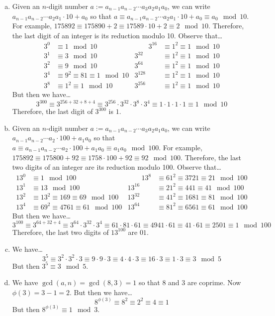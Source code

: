 \documentclass[11pt,letterpaper]{article}
\begin{document}
\sol 
\begin{enumerate}[(a)]
\item Given an $n$-digit number $a:= a_{n-1}a_{n-2} \cdots a_3a_2a_1a_0$, we can write $a_{n-1}a_{n-2} \cdots a_2a_1 \cdot 10 + a_0$ so that $a \equiv a_{n-1}a_{n-2} \cdots a_2a_1 \cdot 10 + a_0 \equiv a_0 \mod 10$. For example, $175892 \equiv 175890 + 2 \equiv 17589 \cdot 10 + 2 \equiv 2 \mod 10$. Therefore, the last digit of an integer is its reduction modulo 10. Observe that\dots
	\[
	\begin{aligned}
	3^0&\equiv 1 \mod 10 &\qquad 3^{16}&\equiv 1^2 \equiv 1 \mod 10 \\
	3^1&\equiv 3 \mod 10 & 3^{32}&\equiv 1^2 \equiv 1 \mod 10 \\
	3^2&\equiv 9 \mod 10 & 3^{64}&\equiv 1^2 \equiv 1 \mod 10 \\
	3^4&\equiv 9^2 \equiv 81 \equiv 1 \mod 10 & 3^{128}&\equiv 1^2 \equiv 1 \mod 10 \\
	3^8&\equiv 1^2 \equiv 1 \mod 10 & 3^{256}&\equiv 1^2 \equiv 1 \mod 10
	\end{aligned}
	\]
But then we have\dots
	\[
	3^{300} \equiv 3^{256 + 32 + 8 + 4} \equiv 3^{256} \cdot 3^{32} \cdot 3^8 \cdot 3^4 \equiv 1 \cdot 1 \cdot 1 \cdot 1 \equiv 1 \mod 10
	\]
Therefore, the last digit of $3^{300}$ is $1$. \pspace

\item Given an $n$-digit number $a:= a_{n-1}a_{n-2} \cdots a_3a_2a_1a_0$, we can write $a_{n-1}a_{n-2} \cdots a_2 \cdot 100 + a_1a_0$ so that $a \equiv a_{n-1}a_{n-2} \cdots a_2 \cdot 100 + a_1a_0 \equiv a_1a_0 \mod 100$. For example, $175892 \equiv 175800 + 92 \equiv 1758 \cdot 100 + 92 \equiv 92 \mod 100$. Therefore, the last two digits of an integer are its reduction modulo 100. Observe that\dots
	\[
	\begin{aligned}
	13^0&\equiv 1 \mod 100 &\qquad 13^8&\equiv 61^2 \equiv 3721 \equiv 21 \mod 100 \\
	13^1&\equiv 13 \mod 100 & 13^{16}&\equiv 21^2 \equiv 441 \equiv 41 \mod 100 \\
	13^2&\equiv 13^2 \equiv 169 \equiv 69 \mod 100 & 13^{32}&\equiv 41^2 \equiv 1681 \equiv 81 \mod 100 \\
	13^4&\equiv 69^2 \equiv 4761 \equiv 61 \mod 100 & 13^{64}&\equiv 81^2 \equiv 6561 \equiv 61 \mod 100
	\end{aligned}
	\]
But then we have\dots
	\[
	3^{100} \equiv 3^{64 + 32 + 4} \equiv 3^{64} \cdot 3^{32} \cdot 3^4 \equiv 61 \cdot 81 \cdot 61 \equiv 4941 \cdot 61 \equiv 41 \cdot 61 \equiv 2501 \equiv 1 \mod 100
	\]
Therefore, the last two digits of $13^{100}$ are $01$.  

\item We have\dots
	\[
	3^5 \equiv 3^2 \cdot 3^2 \cdot 3 \equiv 9 \cdot 9 \cdot 3 \equiv 4 \cdot 4 \cdot 3 \equiv 16 \cdot 3 \equiv 1 \cdot 3 \equiv 3 \mod 5
	\] 
But then $3^5 \equiv 3 \mod 5$. \pspace

\item We have $\gcd(a, n)= \gcd(8, 3)= 1$ so that 8 and 3 are coprime. Now $\phi(3)= 3 - 1= 2$. But then we have\dots
	\[
	8^{\phi(3)} \equiv 8^2 \equiv 2^2 \equiv 4 \equiv 1
	\]
But then $8^{\phi(3)} \equiv 1 \mod 3$. 
\end{enumerate}
\end{document}
